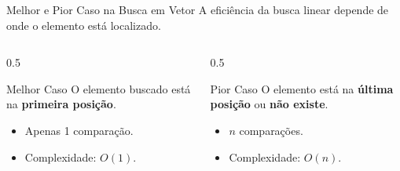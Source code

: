 \documentclass[9pt]{beamer}
\begin{document}
\begin{frame}{Melhor e Pior Caso na Busca em Vetor}
    A eficiência da busca linear depende de onde o elemento está localizado.
    \vspace{0.3cm}
    \begin{columns}
        \begin{column}{0.5\textwidth}
            \begin{exampleblock}{Melhor Caso}
                O elemento buscado está na \textbf{primeira posição}.
                \begin{itemize}
                    \item Apenas 1 comparação.
                    \item Complexidade: $O(1)$.
                \end{itemize}
            \end{exampleblock}
        \end{column}
        \begin{column}{0.5\textwidth}
            \begin{alertblock}{Pior Caso}
                O elemento está na \textbf{última posição} ou \textbf{não existe}.
                \begin{itemize}
                    \item $n$ comparações.
                    \item Complexidade: $O(n)$.
                \end{itemize}
            \end{alertblock}
        \end{column}
    \end{columns}
\end{frame}
\end{document}
